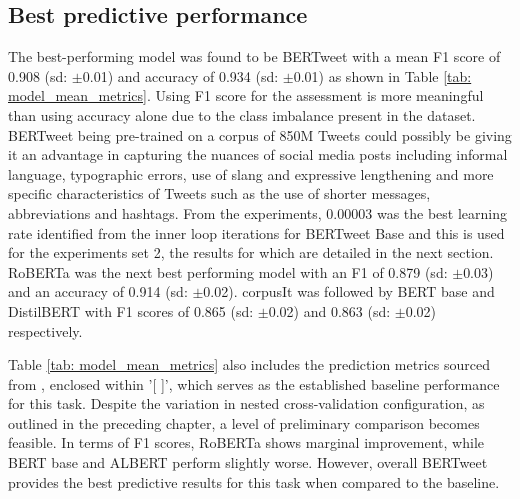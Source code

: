 \subsection{Best predictive performance}
The best-performing model was found to be BERTweet with a mean F1 score of 0.908 (sd: $\pm$0.01) and accuracy of 0.934 (sd: $\pm$0.01) as shown in Table \ref{tab: model_mean_metrics}. Using F1 score for the assessment is more meaningful than using accuracy alone due to the class imbalance present in the dataset. BERTweet being pre-trained on a corpus of 850M Tweets could possibly be giving it an advantage in capturing the nuances of social media posts including informal language, typographic errors, use of slang and expressive lengthening and more specific characteristics of Tweets such as the use of shorter messages, abbreviations and hashtags. From the experiments, 0.00003 was the best learning rate identified from the inner loop iterations for BERTweet Base and this is used for the experiments set 2, the results for which are detailed in the next section. RoBERTa was the next best performing model with an F1 of 0.879 (sd: $\pm$0.03) and an accuracy of 0.914 (sd: $\pm$0.02). corpusIt was followed by BERT base and DistilBERT with F1 scores of 0.865 (sd: $\pm$0.02) and 0.863 (sd: $\pm$0.02) respectively.

Table \ref{tab: model_mean_metrics} also includes the prediction metrics sourced from \cite{jin_complaint_2020}, enclosed within '[ ]', which serves as the established baseline performance for this task. Despite the variation in nested cross-validation configuration, as outlined in the preceding chapter, a level of preliminary comparison becomes feasible. In terms of F1 scores, RoBERTa shows marginal improvement, while BERT base and ALBERT perform slightly worse. However, overall BERTweet provides the best predictive results for this task when compared to the baseline.\\

